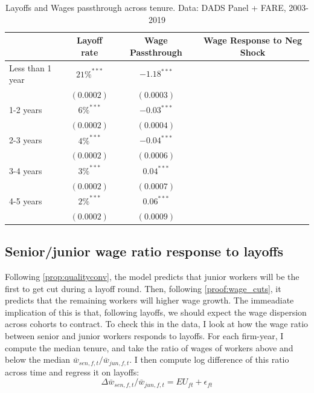 \begin{table}
  \centering
  \begin{tabular}{lccc}
    \hline
    & \multicolumn{1}{c}{Layoff rate} & \multicolumn{1}{c}{Wage Passthrough} &  \multicolumn{1}{c}{Wage Response to Neg Shock}\\
    \hline
    \vspace{-4pt} 
    Less than 1 year        &  $21\%^{***}$   &  $-1.18^{***}$    \\    \vspace{-4pt} 
                        &  $(0.0002)$     &  $(0.0003)$     \\    \vspace{-4pt} 
    1-2 years        &  $6\%^{***}$       &   $-0.03^{***}$     \\     \vspace{-4pt} 
                        &  $(0.0002)$     &  $(0.0004)$       \\    \vspace{-4pt} 
    2-3 years        &  $4\%^{***}$       &  $-0.04^{***}$      \\     \vspace{-4pt} 
                        &  $(0.0002)$     &  $(0.0006)$       \\    \vspace{-4pt} 
    3-4 years        & $3\%^{***}$     &  $0.04^{***}$   \\ \vspace{-4pt}
                        &  $(0.0002)$     &    $(0.0007)$ \\    \vspace{-4pt} 
    4-5 years        & $2\%^{***}$     & $0.06^{***}$  \\    \vspace{-4pt} 
                        &  $(0.0002)$     &    $(0.0009)$ \\  

    \hline
  \end{tabular}
  \caption{Layoffs and Wages passthrough across tenure. Data: DADS Panel + FARE, 2003-2019}
  \label{tab:tenure}
\end{table}
\subsection*{Senior/junior wage ratio response to layoffs} %
Following \ref{prop:qualityconv}, the model predicts that junior workers will be the first to get cut during a layoff round. Then, following \ref{proof:wage_cuts}, it predicts that the remaining workers will higher wage growth. The immeadiate implication of this is that, following layoffs, we should expect the wage dispersion across cohorts to contract. To check this in the data, I look at how the wage ratio between senior and junior workers responds to layoffs. For each firm-year, I compute the median tenure, and take the ratio of wages of workers above and below the median $\bar{w}_{sen,f,t}/\bar{w}_{jun,f,t}$. I then compute log difference of this ratio across time and regress it on layoffs:
\[ \Delta \bar{w}_{sen,f,t}/\bar{w}_{jun,f,t} = EU_{ft} + \epsilon_{ft} \]

